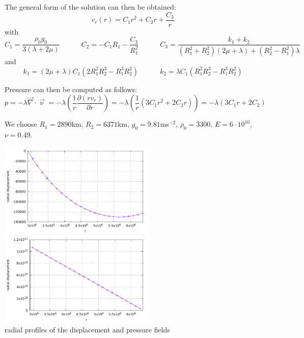 The general form of the solution can then be obtained:
\begin{equation}
v_r(r)=C_1 r^2 + C_2 r + \frac{C_3}{r}
\end{equation}
with 
\begin{equation}
C_1=\frac{\rho_0 g_0}{3(\lambda+2\mu)}
\quad
\quad
\quad
C_2=-C_1 R_1-\frac{C_3}{R_1^2}
\quad
\quad
\quad
C_3=\frac{k_1+k_2}{(R_1^2+R_2^2)(2\mu+\lambda)+(R_2^2-R_1^2)\lambda}
\end{equation}
and
\begin{equation}
k_1=(2\mu+\lambda) C_1 (2 R_1^2  R_2^3 - R_1^3  R_2^2)
\quad
\quad
\quad
k_2 = \lambda  C_1 (R_1^2  R_2^3 - R_1^3  R_2^2)
\end{equation}

Pressure can then be computed as follows: 
\begin{equation}
p=-\lambda {\vec \nabla}\cdot {\vec \upnu}
= -\lambda \left( \frac{1}{r} \frac{\partial (r v_r)}{\partial r} \right)
= -\lambda \left( \frac{1}{r} ( 3C_1r^2 + 2C_2r  )\right)
= -\lambda ( 3C_1r + 2C_2  )
\end{equation}

We choose $R_1=2890$km, $R_2=6371$km, $g_0=9.81$ms$^{-2}$, $\rho_0=3300$, 
$E=6\cdot10^{10}$, $\nu=0.49$.

\begin{center}
\includegraphics[width=7.5cm]{python_codes/fieldstone_36/results/displacement_rtheta.pdf}
\includegraphics[width=7.5cm]{python_codes/fieldstone_36/results/pressure_rtheta.pdf}\\
{\small radial profiles of the displacement and pressure fields}
\end{center}

